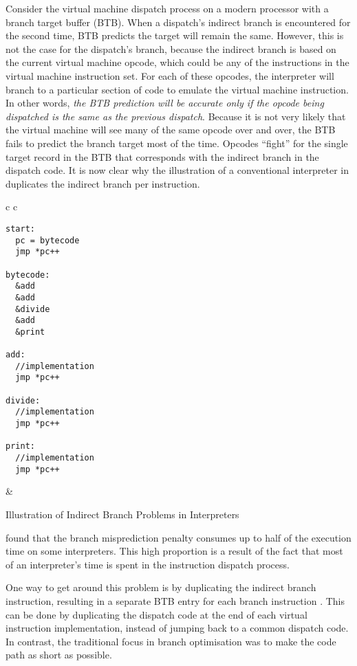 		Consider the virtual machine dispatch process on a modern processor with a branch target buffer (BTB). When a dispatch's indirect branch is encountered for the second time, BTB predicts the target will remain the same. However, this is not the case for the dispatch's branch, because the indirect branch is based on the current virtual machine opcode, which could be any of the instructions in the virtual machine instruction set. For each of these opcodes, the interpreter will branch to a particular section of code to emulate the virtual machine instruction. In other words, \emph{the BTB prediction will be accurate only if the opcode being dispatched is the same as the previous dispatch}. Because it is not very likely that the virtual machine will see many of the same opcode over and over, the BTB fails to predict the branch target most of the time. Opcodes ``fight'' for the single target record in the BTB that corresponds with the indirect branch in the dispatch code. It is now clear why the illustration of a conventional interpreter in  duplicates the indirect branch per instruction.
		
		\begin{myfigure}
			\begin{tabular}{c c}
				{
				\begin{lstlisting}
start:
  pc = bytecode
  jmp *pc++

bytecode:
  &add
  &add
  &divide
  &add
  &print

add:
  //implementation
  jmp *pc++

divide:
  //implementation
  jmp *pc++

print:
  //implementation
  jmp *pc++
				\end{lstlisting}
			} & 
			{
			}
			\end{tabular}
			\caption{Illustration of Indirect Branch Problems in Interpreters}
			\label{fig:interpreterbtb}
		\end{myfigure}
		
		\cite{structureinterpreters} found that the branch misprediction penalty consumes up to half of the execution time on some interpreters. This high proportion is a result of the fact that most of an interpreter's time is spent in the instruction dispatch process.
		
		One way to get around this problem is by duplicating the indirect branch instruction, resulting in a separate BTB entry for each branch instruction \citep{fastjava}. This can be done by duplicating the dispatch code at the end of each virtual instruction implementation, instead of jumping back to a common dispatch code. In contrast, the traditional focus in branch optimisation was to make the code path as short as possible.
		
